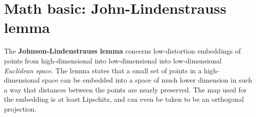 \chapter{Math basic: John-Lindenstrauss lemma}
The \textbf{\textcolor[rgb]{1,0,0}{Johnson-Lindenstrauss lemma}} concerns low-distortion embeddings of points from high-dimensional into low-dimensional into low-dimensional \emph{Euclidean space}. The lemma states that a small set of points in a high-dimensional space can be embedded into a space of much lower dimension in such a way that distances between the points are nearly preserved. The map used for the embedding is at least Lipschitz, and can even be taken to be an orthogonal projection.
